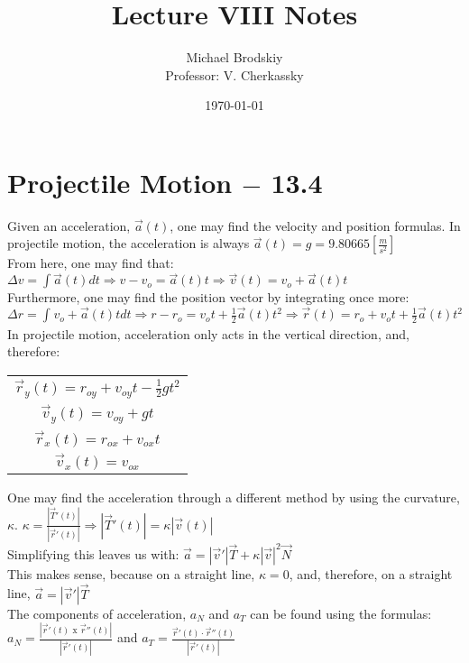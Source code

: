 \documentclass[12pt]{article}
\title{Lecture VIII Notes}
\date{\today}
\author{Michael Brodskiy\\ \small Professor: V. Cherkassky}
\begin{document}
\maketitle

\section{Projectile Motion $-$ 13.4}

Given an acceleration, $\overrightarrow{a}(t)$, one may find the velocity and position formulas. In projectile motion, the acceleration is always $\overrightarrow{a}(t) = g = 9.80665\left[\frac{m}{s^2}\right]$\\

From here, one may find that: $\Delta v = \int \overrightarrow{a}(t) dt \Longrightarrow v-v_o=\overrightarrow{a}(t)t\Longrightarrow \overrightarrow{v}(t)=v_o+\overrightarrow{a}(t)t$\\

Furthermore, one may find the position vector by integrating once more: $\Delta r = \int_{}^{}  v_o + \overrightarrow{a}(t)t dt \Longrightarrow r-r_o=v_ot+\frac{1}{2}\overrightarrow{a}(t)t^2\Longrightarrow \overrightarrow{r}(t)=r_o + v_ot+\frac{1}{2}\overrightarrow{a}(t)t^2$\\

In projectile motion, acceleration only acts in the vertical direction, and, therefore:
\begin{tabular}{c}

  $\overrightarrow{r}_y(t)=r_{oy}+v_{oy}t-\frac{1}{2}gt^2$ \\
  $\overrightarrow{v}_y(t)=v_{oy}+gt$ \\
  $\overrightarrow{r}_x(t)=r_{ox}+v_{ox}t$ \\
  $\overrightarrow{v}_x(t)=v_{ox}$

    
\end{tabular}

One may find the acceleration through a different method by using the curvature, $\kappa$. $\kappa = \frac{|\overrightarrow{T}'(t)|}{|\overrightarrow{r}'(t)|}\Longrightarrow |\overrightarrow{T}'(t)|=\kappa |\overrightarrow{v}(t)|$\\
Simplifying this leaves us with: $\overrightarrow{a}=|\overrightarrow{v}'|\overrightarrow{T} + \kappa |\overrightarrow{v}|^2 \overrightarrow{N}$\\
This makes sense, because on a straight line, $\kappa = 0$, and, therefore, on a straight line, $\overrightarrow{a}=|\overrightarrow{v}'|\overrightarrow{T}$\\

The components of acceleration, $a_N$ and $a_T$ can be found using the formulas: $a_N=\frac{|\overrightarrow{r}'(t)\text{ x } \overrightarrow{r}''(t)|}{|\overrightarrow{r}'(t)|}$ and $a_T = \frac{\overrightarrow{r}'(t)\cdot \overrightarrow{r}''(t)}{|\overrightarrow{r}'(t)|}$
\end{document}
